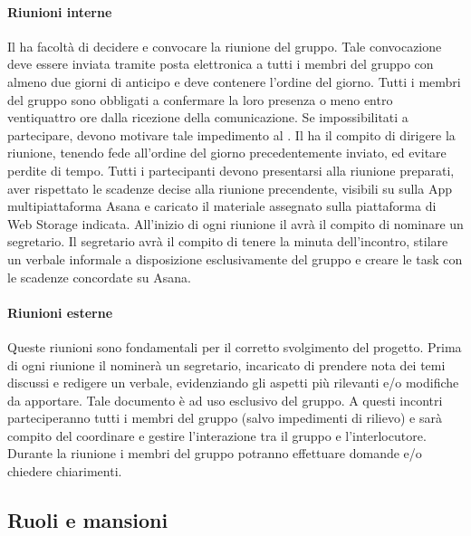 		\paragraph{Riunioni interne}
		Il \textit{\RdP} ha facoltà di decidere e convocare la riunione del gruppo. Tale convocazione deve essere inviata tramite posta elettronica a tutti i membri del gruppo con almeno due giorni di anticipo e deve contenere l’ordine del giorno. Tutti i membri del gruppo sono obbligati a confermare la loro presenza o meno entro ventiquattro ore dalla ricezione della comunicazione. Se impossibilitati a partecipare, devono motivare tale impedimento al \textit{\RdP}. 
		Il \textit{\RdP} ha il compito di dirigere la riunione, tenendo fede all’ordine del giorno precedentemente inviato, ed evitare perdite di tempo. 
		Tutti i partecipanti devono presentarsi alla riunione preparati, aver rispettato le scadenze decise alla riunione precendente, visibili su sulla App multipiattaforma Asana e caricato il materiale assegnato sulla piattaforma di Web Storage indicata.
		All’inizio di ogni riunione il \textit{\RdP} avrà il compito di nominare un segretario. Il segretario avrà il compito di tenere la minuta dell’incontro, stilare un verbale informale a disposizione esclusivamente del gruppo e creare le task con le scadenze concordate su Asana.  
		
		\paragraph{Riunioni esterne}
		Queste riunioni sono fondamentali per il corretto svolgimento del progetto. Prima di ogni riunione il \textit{\RdP} nominerà un segretario, incaricato di prendere nota dei temi discussi e redigere un verbale, evidenziando gli aspetti più rilevanti e/o modifiche da apportare. Tale documento è ad uso esclusivo del gruppo.
		A questi incontri parteciperanno tutti i membri del gruppo (salvo impedimenti di rilievo) e sarà compito del \textit{\RdP} coordinare e gestire l’interazione tra il gruppo e l’interlocutore. Durante la riunione i membri del gruppo potranno effettuare domande e/o chiedere chiarimenti. 





\subsection{Ruoli e mansioni}

